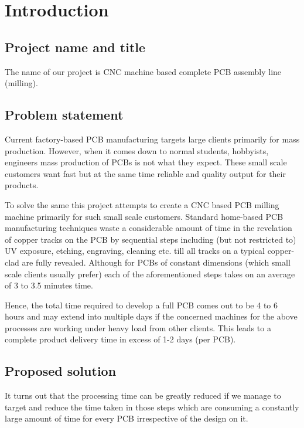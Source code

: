 \chapter{Introduction}
\thispagestyle{empty} %

\setcounter{page}{2} %

\section{Project name and title}
The name of our project is CNC machine based complete PCB assembly line (milling).

\section{Problem statement}
Current factory-based PCB manufacturing targets large clients primarily for mass production. However, when it comes down to normal students, hobbyists, engineers mass production of PCBs is not what they expect. These small scale customers want fast but at the same time reliable and quality output for their products. \par

To solve the same this project attempts to create a CNC based PCB milling machine primarily for such small scale customers. Standard home-based PCB manufacturing techniques waste a considerable amount of time in the revelation of copper tracks on the PCB by sequential steps including (but not restricted to) UV exposure, etching, engraving, cleaning etc. till all tracks on a typical copper-clad are fully revealed. Although for PCBs of constant dimensions (which small scale clients usually prefer) each of the aforementioned steps takes on an average of 3 to 3.5 minutes time. \par

Hence, the total time required to develop a full PCB comes out to be 4 to 6 hours and may extend into multiple days if the concerned machines for the above processes are working under heavy load from other clients. This leads to a complete product delivery time in excess of 1-2 days (per PCB).


\section{Proposed solution}
It turns out that the processing time can be greatly reduced if we manage to target and reduce the time taken in those steps which are consuming a constantly large amount of time for every PCB irrespective of the design on it.  \par

